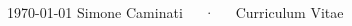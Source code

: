 \documentclass[11pt, a4paper]{awesome-cv}
\begin{document}
  \makecvheader

  \makecvfooter
    {\today}
    {Simone Caminati~~~·~~~Curriculum Vitae}
    {\thepage}


  \setlength{\columnsep}{20pt}
  \begin{paracol}{2}

    \begin{leftcolumn}
      
      
      
    \end{leftcolumn}
    
    \begin{rightcolumn}
      
      
    \end{rightcolumn}

  \end{paracol}

\end{document}
